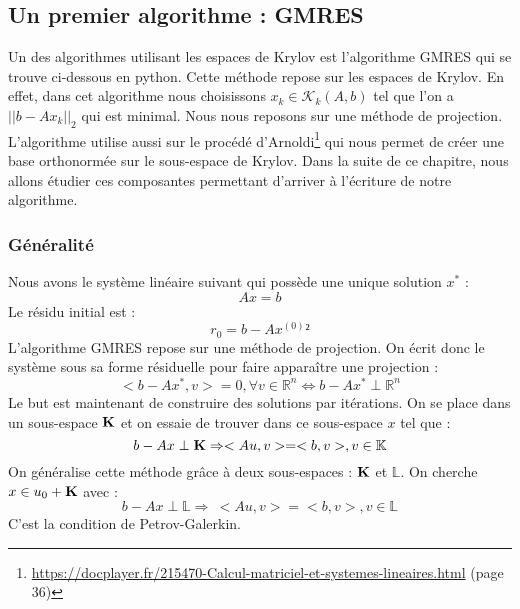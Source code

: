 \subsection{Un premier algorithme : GMRES}
Un des algorithmes utilisant les espaces de Krylov est l'algorithme GMRES qui se trouve ci-dessous en python. Cette méthode repose sur les espaces de Krylov. En effet, dans cet algorithme nous choisissons $x_k \in \mathcal{K}_k(A, b)$ tel que l'on a $||b - Ax_k||_2$ qui est minimal. Nous nous reposons sur une méthode de projection. L'algorithme utilise aussi sur le procédé d'Arnoldi\footnote{\url{https://docplayer.fr/215470-Calcul-matriciel-et-systemes-lineaires.html} (page 36)} qui nous permet de créer une base orthonormée sur le sous-espace de Krylov. Dans la suite de ce chapitre, nous allons étudier ces composantes permettant d'arriver à l'écriture de notre algorithme.

\subsubsection{Généralité}
Nous avons le système linéaire suivant qui possède une unique solution $x^*$ : 
\begin{equation}
Ax = b
\end{equation}
Le résidu initial est  : 
\begin{equation}
r_0 = b - A x^{(0)}²
\end{equation}
L'algorithme GMRES repose sur une méthode de projection. On écrit donc le système sous sa forme résiduelle pour faire apparaître une projection : 
\begin{equation}
< b - Ax^*, v > = 0, \forall v \in \mathbb{R}^n \Leftrightarrow b - Ax^* \perp \mathbb{R}^n
\label{pb_res}
\end{equation}
Le but est maintenant de construire des solutions par itérations. On se place dans un sous-espace $\mathbf{K}$ et on essaie de trouver dans ce sous-espace $x$ tel que : 
\begin{equation}
b - Ax \perp \mathbf{K} \Rightarrow <Au, v> = <b, v>, v \in \mathbb{K}
\end{equation}
On généralise cette méthode grâce à deux sous-espaces : $\mathbf{K}$ et  $\mathbb{L}$. On cherche $x \in u_0 + \mathbf{K}$ avec :
\begin{equation}
b - Ax \perp \mathbb{L} \Rightarrow \ <Au, v> = <b, v>, v \in \mathbb{L}
\label{Petrov-Galerkin}
\end{equation}
C'est la condition de Petrov-Galerkin.


